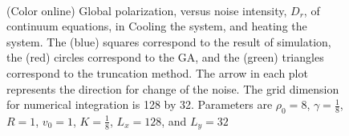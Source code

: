 \documentclass[reprint,floatfix,amsmath,amssymb,aps,pre,showkeys,showpacs,superscriptaddress]{revtex4-1}
\begin{document}
\begin{figure}
	\centering
	\\
	\caption{(Color online) Global polarization, versus noise intensity, $D_r$, of continuum equations, in  Cooling the system, and  heating the system. The (blue) squares correspond to the result of simulation, the (red) circles correspond to the GA, and the (green) triangles correspond to the truncation method. The arrow in each plot represents the direction for change of the noise. The grid dimension for numerical integration is 128 by 32. Parameters are $\rho_0=8$, $\gamma=\tfrac{1}{8}$, $R=1$, $v_0=1$, $K=\tfrac{1}{8}$, $L_x=128$, and $L_y=32$}
	\label{fig:f-alignment}
\end{figure}
\end{document}
